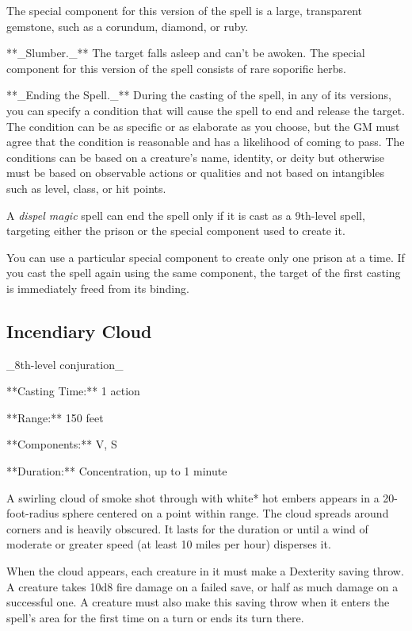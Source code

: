 The special component for this version of the spell is a large, transparent gemstone, such as a corundum, diamond, or ruby.

**_Slumber._** The target falls asleep and can’t be awoken. The special component for this version of the spell consists of rare soporific herbs.

**_Ending the Spell._** During the casting of the spell, in any of its versions, you can specify a condition that will cause the spell to end and release the target. The condition can be as specific or as elaborate as you choose, but the GM must agree that the condition is reasonable and has a likelihood of coming to pass. The conditions can be based on a creature’s name, identity, or deity but otherwise must be based on observable actions or qualities and not based on intangibles such as level, class, or hit points.

A \textit{dispel magic} spell can end the spell only if it is cast as a 9th-level spell, targeting either the prison or the special component used to create it.

You can use a particular special component to create only one prison at a time. If you cast the spell again using the same component, the target of the first casting is immediately freed from its binding.

\subsection{Incendiary Cloud}

_8th-level conjuration_

**Casting Time:** 1 action

**Range:** 150 feet

**Components:** V, S

**Duration:** Concentration, up to 1 minute

A swirling cloud of smoke shot through with white* hot embers appears in a 20-foot-radius sphere centered on a point within range. The cloud spreads around corners and is heavily obscured. It lasts for the duration or until a wind of moderate or greater speed (at least 10 miles per hour) disperses it.

When the cloud appears, each creature in it must make a Dexterity saving throw. A creature takes 10d8 fire damage on a failed save, or half as much damage on a successful one. A creature must also make this saving throw when it enters the spell’s area for the first time on a turn or ends its turn there.

